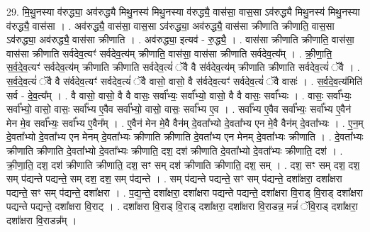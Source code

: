 \documentclass[17pt]{extarticle}
\begin{document}
29. मि॒थु॒नस्या व॑रुद्ध्या॒ अव॑रुद्ध्यै मिथु॒नस्य॑ मिथु॒नस्या व॑रुद्ध्यै॒ वास॑सा॒ वास॒सा ऽव॑रुद्ध्यै मिथु॒नस्य॑ मिथु॒नस्या व॑रुद्ध्यै॒ वास॑सा । . अव॑रुद्ध्यै॒ वास॑सा॒ वास॒सा ऽव॑रुद्ध्या॒ अव॑रुद्ध्यै॒ वास॑सा क्रीणाति क्रीणाति॒ वास॒सा ऽव॑रुद्ध्या॒ अव॑रुद्ध्यै॒ वास॑सा क्रीणाति । . अव॑रुद्ध्या॒ इत्यव॑ - रु॒द्ध्यै॒ । . वास॑सा क्रीणाति क्रीणाति॒ वास॑सा॒ वास॑सा क्रीणाति सर्वदेव॒त्यꣳ॑ सर्वदेव॒त्य॑म् क्रीणाति॒ वास॑सा॒ वास॑सा क्रीणाति सर्वदेव॒त्य᳚म् । . क्री॒णा॒ति॒ स॒र्व॒दे॒व॒त्यꣳ॑ सर्वदेव॒त्य॑म् क्रीणाति क्रीणाति सर्वदेव॒त्यं॑ ॅवै वै स॑र्वदेव॒त्य॑म् क्रीणाति क्रीणाति सर्वदेव॒त्यं॑ ॅवै । . स॒र्व॒दे॒व॒त्यं॑ ॅवै वै स॑र्वदेव॒त्यꣳ॑ सर्वदेव॒त्यं॑ ॅवै वासो॒ वासो॒ वै स॑र्वदेव॒त्यꣳ॑ सर्वदेव॒त्यं॑ ॅवै वासः॑ । . स॒र्व॒दे॒व॒त्य॑मिति॑ सर्व - दे॒व॒त्य᳚म् । . वै वासो॒ वासो॒ वै वै वासः॒ सर्वा᳚भ्यः॒ सर्वा᳚भ्यो॒ वासो॒ वै वै वासः॒ सर्वा᳚भ्यः । . वासः॒ सर्वा᳚भ्यः॒ सर्वा᳚भ्यो॒ वासो॒ वासः॒ सर्वा᳚भ्य ए॒वैव सर्वा᳚भ्यो॒ वासो॒ वासः॒ सर्वा᳚भ्य ए॒व । . सर्वा᳚भ्य ए॒वैव सर्वा᳚भ्यः॒ सर्वा᳚भ्य ए॒वैन॑ मेन मे॒व सर्वा᳚भ्यः॒ सर्वा᳚भ्य ए॒वैन᳚म् । . ए॒वैन॑ मेन मे॒वै वैन॑म् दे॒वता᳚भ्यो दे॒वता᳚भ्य एन मे॒वै वैन॑म् दे॒वता᳚भ्यः । . ए॒न॒म् दे॒वता᳚भ्यो दे॒वता᳚भ्य एन मेनम् दे॒वता᳚भ्यः क्रीणाति क्रीणाति दे॒वता᳚भ्य एन मेनम् दे॒वता᳚भ्यः क्रीणाति । . दे॒वता᳚भ्यः क्रीणाति क्रीणाति दे॒वता᳚भ्यो दे॒वता᳚भ्यः क्रीणाति॒ दश॒ दश॑ क्रीणाति दे॒वता᳚भ्यो दे॒वता᳚भ्यः क्रीणाति॒ दश॑ । . क्री॒णा॒ति॒ दश॒ दश॑ क्रीणाति क्रीणाति॒ दश॒ सꣳ सम् दश॑ क्रीणाति क्रीणाति॒ दश॒ सम् । . दश॒ सꣳ सम् दश॒ दश॒ सम् प॑द्यन्ते पद्यन्ते॒ सम् दश॒ दश॒ सम् प॑द्यन्ते । . सम् प॑द्यन्ते पद्यन्ते॒ सꣳ सम् प॑द्यन्ते॒ दशा᳚क्षरा॒ दशा᳚क्षरा पद्यन्ते॒ सꣳ सम् प॑द्यन्ते॒ दशा᳚क्षरा । . प॒द्य॒न्ते॒ दशा᳚क्षरा॒ दशा᳚क्षरा पद्यन्ते पद्यन्ते॒ दशा᳚क्षरा वि॒राड् वि॒राड् दशा᳚क्षरा पद्यन्ते पद्यन्ते॒ दशा᳚क्षरा वि॒राट् । . दशा᳚क्षरा वि॒राड् वि॒राड् दशा᳚क्षरा॒ दशा᳚क्षरा वि॒राडन्न॒ मन्नं॑ ॅवि॒राड् दशा᳚क्षरा॒ दशा᳚क्षरा वि॒राडन्न᳚म् । \newline
\end{document}
